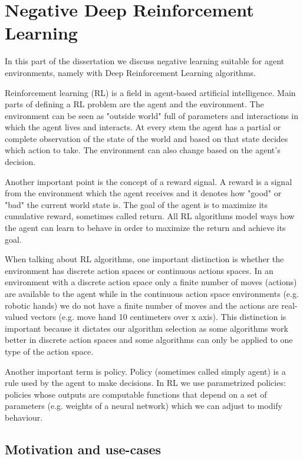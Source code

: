 \documentclass[b5paper]{book}
\let\cite\parencite
\begin{document}
\chapter{Negative Deep Reinforcement Learning}

In this part of the dissertation we discuss negative learning suitable for agent environments, namely with Deep Reinforcement Learning algorithms.

Reinforcement learning (RL) is a field in agent-based artificial intelligence. \cite{russell2002artificial} Main parts of defining a RL problem are the agent and the environment. The environment can be seen as "outside world" full of parameters and interactions in which the agent lives and interacts. At every stem the agent has a partial or complete observation of the state of the world and based on that state decides which action to take. The environment can also change based on the agent's decision.

Another important point is the concept of a reward signal. A reward is a signal from the environment which the agent receives and it denotes how "good" or "bad" the current world state is. The goal of the agent is to maximize its cumulative reward, sometimes called return. All RL algorithms model ways how the agent can learn to behave in order to maximize the return and achieve its goal.

When talking about RL algorithms, one important distinction is whether the environment has discrete action spaces or continuous actions spaces. In an environment with a discrete action space only a finite number of moves (actions) are available to the agent while in the continuous action space environments (e.g. robotic hands) we do not have a finite number of moves and the actions are real-valued vectors (e.g. move hand 10 centimeters over x axis). This distinction is important because it dictates our algorithm selection as some algorithms work better in discrete action spaces and some algorithms can only be applied to one type of the action space.

Another important term is policy. Policy (sometimes called simply agent) is a rule used by the agent to make decisions. In RL we use parametrized policies: policies whose outputs are computable functions that depend on a set of parameters (e.g. weights of a neural network) which we can adjust to modify behaviour. 


\section{Motivation and use-cases} 
\end{document}
